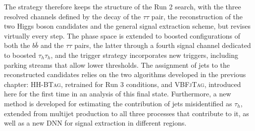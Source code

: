 The strategy therefore keeps the structure of the Run 2 search, with the three resolved channels defined by the decay of the $\tau\tau$ pair, the reconstruction of the two Higgs boson candidates and the general signal extraction scheme, but revises virtually every step. The phase space is extended to boosted configurations of both the $b\bar{b}$ and the $\tau\tau$ pairs, the latter through a fourth signal channel dedicated to boosted $\tau_h\tau_h$, and the trigger strategy incorporates new triggers, including parking streams that allow lower thresholds. The assignment of jets to the reconstructed candidates relies on the two algorithms developed in the previous chapter: \textsc{HH-BTag}, retrained for Run 3 conditions, and \textsc{VBFjTag}, introduced here for the first time in an analysis of this final state. Furthermore, a new method is developed for estimating the contribution of jets misidentified as $\tau_h$, extended from multijet production to all three processes that contribute to it, as well as a new DNN for signal extraction in different regions.


